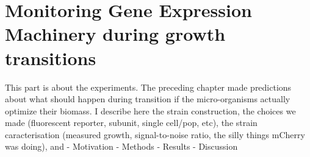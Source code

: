 \chapter{Monitoring Gene Expression Machinery during growth transitions}

This part is about the experiments. The preceding chapter made predictions about what should happen during transition if the micro-organisms actually optimize their biomass.
I describe here the strain construction, the choices we made (fluorescent reporter, subunit, single cell/pop, etc), the strain caracterisation (measured growth, signal-to-noise ratio,
the silly things mCherry was doing), and
- Motivation
- Methods
- Results
- Discussion